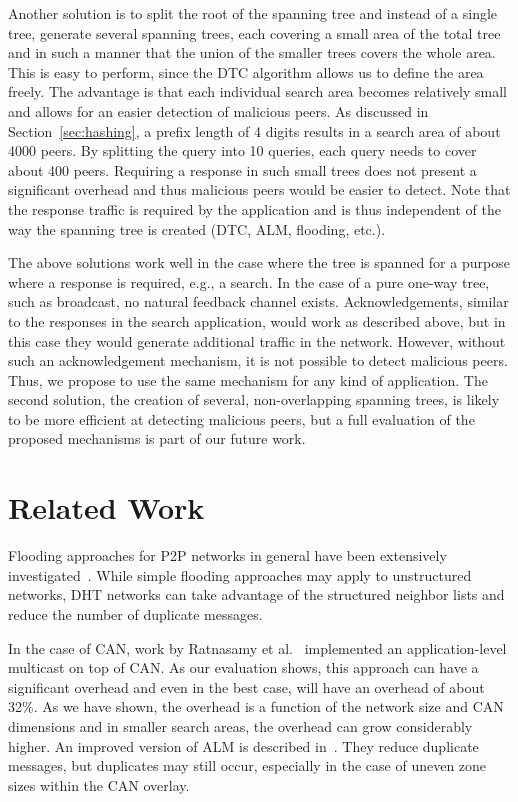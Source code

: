 \documentclass[fleqn,12pt,twoside]{article}
\begin{document}
Another solution is to split the root of the spanning tree and instead
of a single tree, generate several spanning trees, each covering a
small area of the total tree and in such a manner that the union of
the smaller trees covers the whole area. This is easy to perform,
since the DTC algorithm allows us to define the area freely. The
advantage is that each individual search area becomes relatively small
and allows for an easier detection of malicious peers. As discussed in
Section~\ref{sec:hashing}, a prefix length of 4 digits results in a
search area of about 4000 peers. By splitting the query into 10
queries, each query needs to cover about 400 peers. Requiring a
response in such small trees does not present a significant overhead
and thus malicious peers would be easier to detect. Note that the
response traffic is required by the application and is thus
independent of the way the spanning tree is created (DTC, ALM,
flooding, etc.).

The above solutions work well in the case where the tree is spanned
for a purpose where a response is required, e.g., a search. In the
case of a pure one-way tree, such as broadcast, no natural feedback
channel exists. Acknowledgements, similar to the responses in the
search application, would work as described above, but in this case
they would generate additional traffic in the network. However,
without such an acknowledgement mechanism, it is not possible to
detect malicious peers. Thus, we propose to use the same mechanism for
any kind of application. The second solution, the creation of several,
non-overlapping spanning trees, is likely to be more efficient at
detecting malicious peers, but a full evaluation of the proposed
mechanisms is part of our future work.


\section{Related Work}
\label{sec:related-work}

Flooding approaches for P2P networks in general have been extensively
investigated~\cite{jiang2003lef,chawathe2003mgl,TerpstraW:BubbleStorm}.
While simple flooding approaches may apply to unstructured networks,
DHT networks can take advantage of the structured neighbor lists and
reduce the number of duplicate messages.

In the case of CAN, work by Ratnasamy et al.~\cite{ratnasamy2001alm}
implemented an application-level multicast on top of CAN. As our
evaluation shows, this approach can have a significant overhead and
even in the best case, will have an overhead of about 32\%. As we have
shown, the overhead is a function of the network size and CAN
dimensions and in smaller search areas, the overhead can grow
considerably higher. An improved version of ALM is described
in~\cite{Castro2003}.  They reduce duplicate messages, but duplicates
may still occur, especially in the case of uneven zone sizes within
the CAN overlay.
\end{document}
